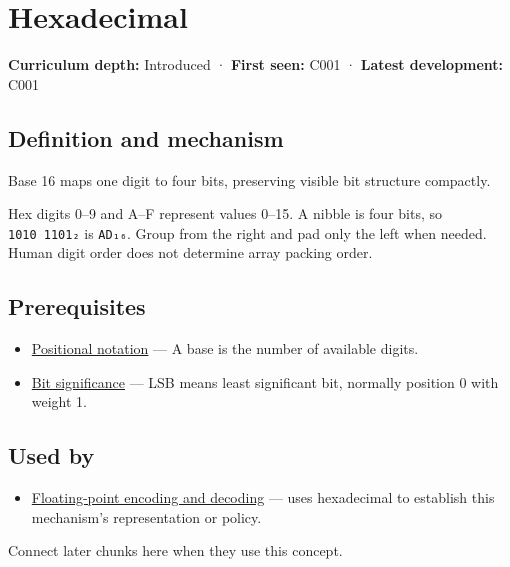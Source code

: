 \hypertarget{appendix-6b8075763724}{}\label{referencestart:appendix-6b8075763724}
\section{Hexadecimal}\label{appendix-6b8075763724-hexadecimal}

\textbf{Curriculum depth:} Introduced · \textbf{First seen:} C001 · \textbf{Latest development:} C001

\subsection{Definition and mechanism}\label{appendix-6b8075763724-definition-and-mechanism}

Base 16 maps one digit to four bits, preserving visible bit structure compactly.

Hex digits 0--9 and A--F represent values 0--15. A nibble is four bits, so \texttt{1010\ 1101₂} is \texttt{AD₁₆}. Group from the right and pad only the left when needed. Human digit order does not determine array packing order.

\subsection{Prerequisites}\label{appendix-6b8075763724-prerequisites}

\begin{itemize}
\tightlist
\item
  \hyperref[appendix-83c3f28f7bda]{Positional notation} --- A base is the number of available digits.
\item
  \hyperref[appendix-280445746493]{Bit significance} --- LSB means least significant bit, normally position 0 with weight 1.
\end{itemize}

\subsection{Used by}\label{appendix-6b8075763724-used-by}

\begin{itemize}
\tightlist
\item
  \hyperref[appendix-6854d0e2218e]{Floating-point encoding and decoding} --- uses hexadecimal to establish this mechanism's representation or policy.
\end{itemize}

Connect later chunks here when they use this concept.

